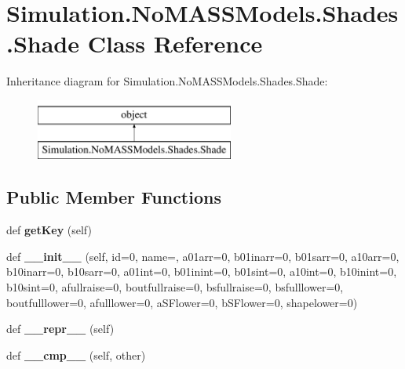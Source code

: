 \hypertarget{class_c_simulation_1_1_simulation_1_1_no_m_a_s_s_models_1_1_shades_1_1_shade}{}\section{Simulation.\+No\+M\+A\+S\+S\+Models.\+Shades.\+Shade Class Reference}
\label{class_c_simulation_1_1_simulation_1_1_no_m_a_s_s_models_1_1_shades_1_1_shade}
Inheritance diagram for Simulation.\+No\+M\+A\+S\+S\+Models.\+Shades.\+Shade\+:\begin{figure}[H]
\begin{center}
\leavevmode
\includegraphics[height=2.000000cm]{class_c_simulation_1_1_simulation_1_1_no_m_a_s_s_models_1_1_shades_1_1_shade}
\end{center}
\end{figure}
\subsection*{Public Member Functions}
\begin{DoxyCompactItemize}
\item 
\mbox{\label{class_c_simulation_1_1_simulation_1_1_no_m_a_s_s_models_1_1_shades_1_1_shade_a005f8f2d5acfee7d24d1aac6005a1e0a}} 
def {\bfseries get\+Key} (self)
\item 
\mbox{\label{class_c_simulation_1_1_simulation_1_1_no_m_a_s_s_models_1_1_shades_1_1_shade_aecfe92e74f185bbe044724fc20ff0e0e}} 
def {\bfseries \+\_\+\+\_\+init\+\_\+\+\_\+} (self, id=0, name=\textquotesingle{}\textquotesingle{}, a01arr=0, b01inarr=0, b01sarr=0, a10arr=0, b10inarr=0, b10sarr=0, a01int=0, b01inint=0, b01sint=0, a10int=0, b10inint=0, b10sint=0, afullraise=0, boutfullraise=0, bsfullraise=0, bsfulllower=0, boutfulllower=0, afulllower=0, a\+S\+Flower=0, b\+S\+Flower=0, shapelower=0)
\item 
\mbox{\label{class_c_simulation_1_1_simulation_1_1_no_m_a_s_s_models_1_1_shades_1_1_shade_a9a47563093dfc5ba12274b66e368920c}} 
def {\bfseries \+\_\+\+\_\+repr\+\_\+\+\_\+} (self)
\item 
\mbox{\label{class_c_simulation_1_1_simulation_1_1_no_m_a_s_s_models_1_1_shades_1_1_shade_a157f9a5d3230b5fbbcb1391575ca1662}} 
def {\bfseries \+\_\+\+\_\+cmp\+\_\+\+\_\+} (self, other)
\end{DoxyCompactItemize}
